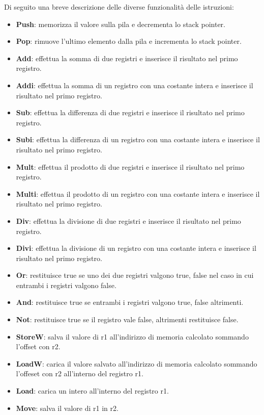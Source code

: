 \documentclass[12pt,twoside,openright,a4paper]{report}
\begin{document}
Di seguito una breve descrizione delle diverse funzionalità delle istruzioni:
\begin{itemize} 

   \item\textbf{Push}: memorizza il valore sulla pila e decrementa lo stack pointer.
    \item\textbf{Pop}: rimuove l'ultimo elemento dalla pila e incrementa lo stack pointer.
    \item\textbf{Add}: effettua la somma di due registri e inserisce il risultato nel primo registro.
    \item\textbf{Addi}: effettua la somma di un registro con una costante intera e inserisce il risultato nel primo registro.
    \item\textbf{Sub}: effettua la differenza di due registri e inserisce il risultato nel primo registro.
    \item\textbf{Subi}: effettua la differenza di un registro con una costante intera e inserisce il risultato nel primo registro.
    \item\textbf{Mult}: effettua il prodotto di due registri e inserisce il risultato nel primo registro.
    \item\textbf{Multi}: effettua il prodotto di un registro con una costante intera e inserisce il risultato nel primo registro.
   \item\textbf{Div}: effettua la divisione di due registri e inserisce il risultato nel primo registro.
   \item\textbf{Divi}: effettua la divisione di un registro con una costante intera e inserisce il risultato nel primo registro.
    \item\textbf{Or}: restituisce true se uno dei due registri valgono true, false nel caso in cui entrambi i registri valgono false.
    \item\textbf{And}: restituisce true se entrambi i registri valgono true, false altrimenti.
    \item\textbf{Not}: restituisce true se il registro vale false, altrimenti restituisce false.
    \item\textbf{StoreW}: salva il valore di r1 all'indirizzo di memoria calcolato sommando l'offset con r2.
    \item\textbf{LoadW}: carica il valore salvato all'indirizzo di memoria calcolato sommando l'offeset con r2 all'interno del registro r1.
    \item\textbf{Load}: carica un intero all'interno del registro r1.
    \item\textbf{Move}: salva il valore di r1 in r2.

\end{itemize}
\end{document}
